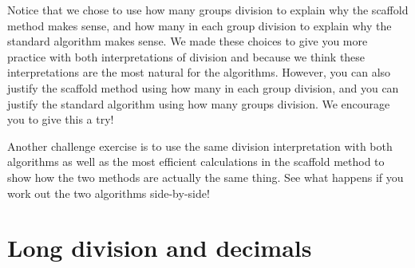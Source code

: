 \documentclass{ximera}
\begin{document}
Notice that we chose to use how many groups division to explain why the scaffold method makes sense, and how many in each group division to explain why the standard algorithm makes sense. We made these choices to give you more practice with both interpretations of division and because we think these interpretations are the most natural for the algorithms. However, you can also justify the scaffold method using how many in each group division, and you can justify the standard algorithm using how many groups division. We encourage you to give this a try!

Another challenge exercise is to use the same division interpretation with both algorithms as well as the most efficient calculations in the scaffold method to show how the two methods are actually the same thing. See what happens if you work out the two algorithms side-by-side!




\section{Long division and decimals}
\end{document}
